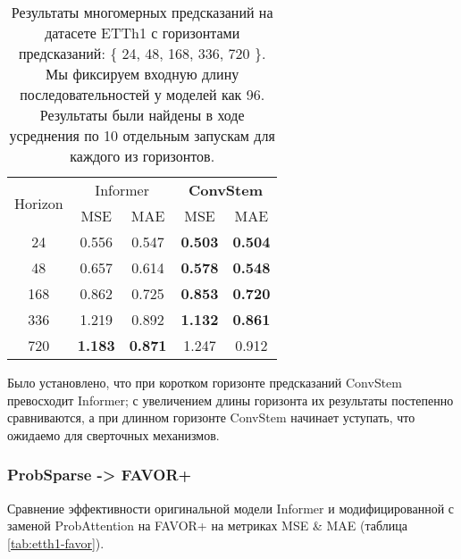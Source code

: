 \begin{table}[!ht]
    \centering
    \begin{tabular}{c  cc  cc}
    \toprule
    \multirow{2}{*}{{Horizon}} 
      & \multicolumn{2}{c}{{Informer}} 
      & \multicolumn{2}{c}{\textbf{ConvStem}} \\
    \cmidrule(lr){2-3} \cmidrule(lr){4-5}
      & {MSE} & {MAE} 
      & {MSE} & {MAE} \\
    \midrule
    24   & 0.556 & 0.547 & \textbf{0.503} & \textbf{0.504} \\
    48   & 0.657 & 0.614 & \textbf{0.578} & \textbf{0.548} \\
    168  & 0.862 & 0.725 & \textbf{0.853} & \textbf{0.720} \\
    336  & 1.219 & 0.892 & \textbf{1.132} & \textbf{0.861} \\
    720  & \textbf{1.183} & \textbf{0.871} & 1.247 & 0.912 \\
    \bottomrule
    \end{tabular}
    \caption{Результаты многомерных предсказаний на датасете ETTh1 с 
    горизонтами предсказаний: \{ 24, 48, 168, 336, 720 \}. 
    Мы фиксируем входную длину последовательностей у моделей как 96.
    Результаты были найдены в ходе усреднения по 10 отдельным запускам 
    для каждого из горизонтов.}
    \label{tab:etth1-convstem}
\end{table}

Было установлено, что при коротком горизонте предсказаний 
ConvStem превосходит Informer; с увеличением длины горизонта 
их результаты постепенно сравниваются, а при длинном горизонте 
ConvStem начинает уступать, что ожидаемо для сверточных механизмов.

\subsubsection{ProbSparse -> FAVOR+}

Сравнение эффективности оригинальной модели Informer и модифицированной
с заменой ProbAttention на FAVOR+ 
на метриках MSE \& MAE (таблица \ref{tab:etth1-favor}).

